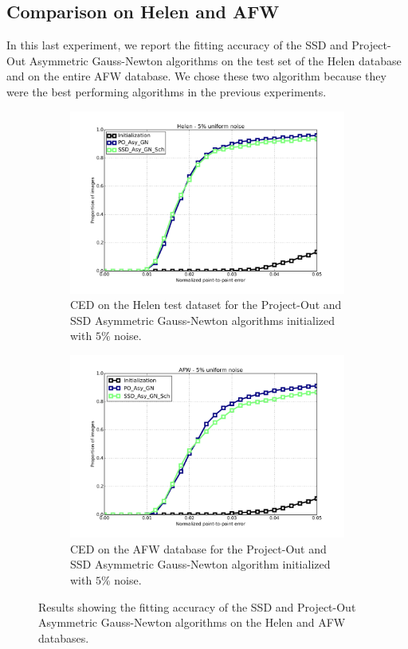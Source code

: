 \subsection{Comparison on Helen and AFW}

In this last experiment, we report the fitting accuracy of the SSD and Project-Out Asymmetric Gauss-Newton algorithms on the test set of the Helen database and on the entire AFW database. We chose these two algorithm because they were the best performing algorithms in the previous experiments. 

\begin{figure}[h!]
	\centering
	\begin{subfigure}{0.48\textwidth}
	    \includegraphics[width=\textwidth]{experiments/best/ced_helen_5.png}
	    \caption{CED on the Helen test dataset for the Project-Out and SSD Asymmetric Gauss-Newton algorithms initialized with $5\%$ noise.}
	    \label{fig:ced_po_for_gn}
	\end{subfigure}
	\hfill
	\begin{subfigure}{0.48\textwidth}
	    \includegraphics[width=\textwidth]{experiments/best/ced_afw_5.png}
	    \caption{CED on the AFW database for the Project-Out and SSD Asymmetric Gauss-Newton algorithm initialized with $5\%$ noise.}
	    \label{fig:ced_po_inv_gn}
	\end{subfigure}
	\label{fig:alpha}
	\caption{Results showing the fitting accuracy of the SSD and Project-Out Asymmetric Gauss-Newton algorithms on the Helen and AFW databases.}
\end{figure}

